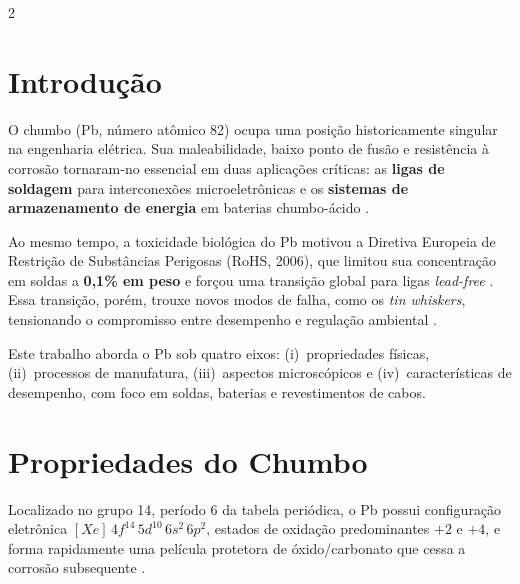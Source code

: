 \documentclass[12pt]{article}
\begin{document}
\begin{multicols}{2}

\section{Introdução}

O chumbo (Pb, número atômico 82) ocupa uma posição historicamente singular na
engenharia elétrica. Sua maleabilidade, baixo ponto de fusão e resistência à corrosão
tornaram-no essencial em duas aplicações críticas: as \textbf{ligas de soldagem} para
interconexões microeletrônicas e os \textbf{sistemas de armazenamento de energia} em
baterias chumbo-ácido \cite{ref_umbrex}.

Ao mesmo tempo, a toxicidade biológica do Pb motivou a Diretiva Europeia de Restrição
de Substâncias Perigosas (RoHS, 2006), que limitou sua concentração em soldas a
\textbf{0,1\% em peso} e forçou uma transição global para ligas \textit{lead-free}
\cite{ref_solder_wiki}. Essa transição, porém, trouxe novos modos de falha, como os
\textit{tin whiskers}, tensionando o compromisso entre desempenho e regulação ambiental
\cite{ref_nasa_whisker}.

Este trabalho aborda o Pb sob quatro eixos: (i)~propriedades físicas, (ii)~processos de
manufatura, (iii)~aspectos microscópicos e (iv)~características de desempenho, com foco
em soldas, baterias e revestimentos de cabos.

\section{Propriedades do Chumbo}

Localizado no grupo 14, período 6 da tabela periódica, o Pb possui configuração
eletrônica \([Xe]\,4f^{14}\,5d^{10}\,6s^{2}\,6p^{2}\), estados de oxidação predominantes
\(+2\) e \(+4\), e forma rapidamente uma película protetora de óxido/carbonato que cessa
a corrosão subsequente \cite{ref_lead_wiki}.


\end{multicols}
\end{document}
